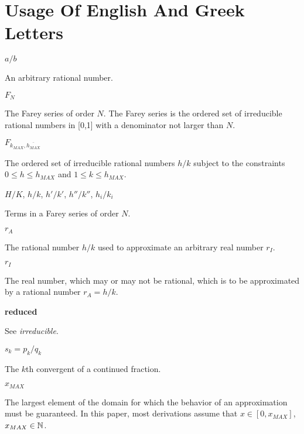 
\section*{Usage Of English And Greek Letters}

\begin{vworkmathtermglossaryenum}

\item \mbox {\boldmath $a/b$}

      An arbitrary rational number.

\item \mbox {\boldmath $ F_N $}

      The Farey 
      series of order $N$.  The Farey series is the
      ordered set of irreducible rational numbers 
          in [0,1] with a
      denominator not larger than $N$.

\item \mbox {\boldmath $F_{k_{MAX}, \overline{h_{MAX}}}$}
      
          The ordered set of irreducible rational numbers
          $h/k$ subject to the constraints $0 \leq h \leq h_{MAX}$
          and $1 \leq k \leq h_{MAX}$.  


\item \mbox{\boldmath $H/K$}, \mbox{\boldmath $h/k$},
      \mbox{\boldmath $h'/k'$}, \mbox{\boldmath $h''/k''$},
      \mbox{\boldmath $h_i/k_i$}

      Terms in a Farey series of order $N$.

\item \mbox{\boldmath $r_A$}

      The rational number $h/k$ used to approximate
      an arbitrary real number $r_I$.

\item \mbox{\boldmath $r_I$}

      The real number, which may or may not be rational,
      which is to be approximated by a rational number
      $r_A = h/k$.

\item \textbf{reduced}

      See \emph{irreducible}.

\item \mbox{\boldmath $s_k = p_k/q_k$}

      The $k$th convergent of a continued fraction.

\item \mbox{\boldmath $x_{MAX}$}

      The largest element of the domain for which the
      behavior of an approximation must be guaranteed.
      In this paper, most derivations assume
      that $x \in [0, x_{MAX}]$, $x_{MAX} \in {\mathbb{N}}{}$.
\end{vworkmathtermglossaryenum}

